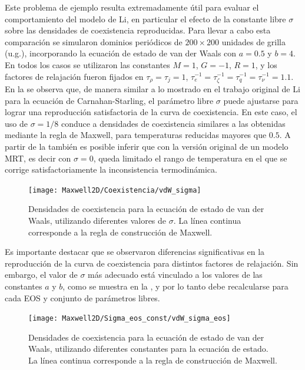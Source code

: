 Este problema de ejemplo resulta extremadamente \'util para evaluar el comportamiento del modelo de Li, en particular el efecto de la constante libre $\sigma$ sobre las densidades de coexistencia reproducidas. Para llevar a cabo esta comparaci\'on se simularon dominios peri\'odicos de $200\times 200$ unidades de grilla (u.g.), incorporando la ecuaci\'on de estado de van der Waals con $a=0.5$ y $b=4$. En todos los casos se utilizaron las constantes $M=1$, $G=-1$, $R=1$, y los factores de relajaci\'on fueron fijados en $\tau_{\rho} = \tau_j=1$, $\tau_{e}^{-1}=\tau_{\zeta}^{-1}=\tau_{q}^{-1}=\tau_{\nu}^{-1}=1.1$. En la  se observa que, de manera similar a lo mostrado en el trabajo original de Li \cite{li_lattice_2013} para la ecuaci\'on de Carnahan-Starling, el par\'ametro libre $\sigma$ puede ajustarse para lograr una reproducci\'on satisfactoria de la curva de coexistencia. En este caso, el uso de $\sigma=1/8$ conduce a densidades de coexistencia similares a las obtenidas mediante la regla de Maxwell, para temperaturas reducidas mayores que $0.5$. A partir de la  tambi\'en es posible inferir que con la versi\'on original de un modelo \pp{} MRT, es decir con $\sigma=0$, queda limitado el rango de temperatura en el que se corrige satisfactoriamente la inconsistencia termodin\'amica.

\begin{figure}[ht]
	\centering
	\texttt{[image: Maxwell2D/Coexistencia/vdW\_sigma]}
	\caption{Densidades de coexistencia para la ecuaci\'on de estado de van der Waals, utilizando diferentes valores de $\sigma$. La l\'inea continua corresponde a la regla de construcci\'on de Maxwell.}
	\label{fig:maxwell_vdW}
\end{figure}

Es importante destacar que se observaron diferencias significativas en la reproducci\'on de la curva de coexistencia para distintos factores de relajaci\'on. Sin embargo, el valor de $\sigma$ m\'as adecuado est\'a vinculado a los valores de las constantes $a$ y $b$, como se muestra en la , y por lo tanto debe recalcularse para cada EOS y conjunto de par\'ametros libres.

\begin{figure}[ht]
	\centering
	\texttt{[image: Maxwell2D/Sigma\_eos\_const/vdW\_sigma\_eos]}
	\caption{Densidades de coexistencia para la ecuaci\'on de estado de van der Waals, utilizando diferentes constantes para la ecuaci\'on de estado. La l\'inea continua corresponde a la regla de construcci\'on de Maxwell.}
	\label{fig:maxwell_vdW_eos}
\end{figure}


